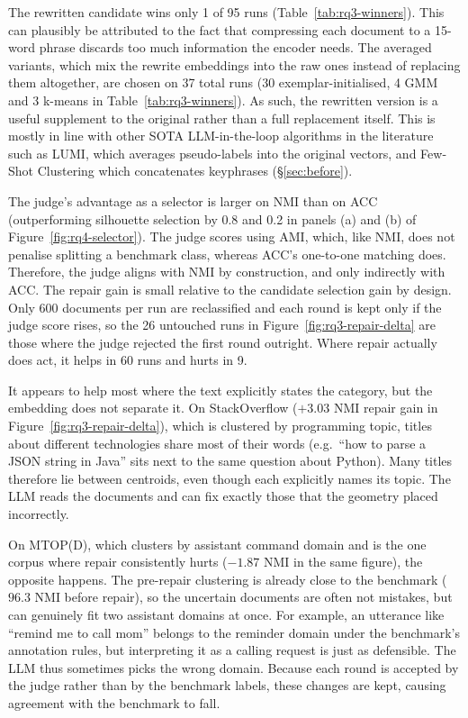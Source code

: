 \documentclass[11pt,a4paper,oneside]{report}
\begin{document}
The rewritten candidate wins only 1 of 95 runs
(Table~\ref{tab:rq3-winners}). This can plausibly be attributed to the fact that compressing each document to a 15-word phrase discards too much information the encoder needs. The averaged variants, which mix the rewrite embeddings into the raw ones instead of replacing
them altogether, are chosen on 37 total runs (30 exemplar-initialised, 4 GMM and 3 k-means in Table~\ref{tab:rq3-winners}). As such, the rewritten version is a useful supplement to the original rather than a full replacement itself. This is mostly in line with other SOTA LLM-in-the-loop algorithms in the literature such as LUMI, which averages pseudo-labels into the original vectors, and Few-Shot Clustering which concatenates keyphrases (\S\ref{sec:before}).


The judge's advantage as a selector is larger on NMI than on ACC (outperforming silhouette selection by 0.8 and 0.2 in panels (a) and (b) of Figure~\ref{fig:rq4-selector}). The judge scores using AMI, which, like NMI, does not penalise splitting a benchmark class, whereas ACC's one-to-one matching does. Therefore, the judge aligns with NMI by construction, and only indirectly with ACC. The repair gain is small relative to the candidate selection gain by design. Only 600 documents per run are reclassified and each round is kept only if
the judge score rises, so the 26 untouched runs in
Figure~\ref{fig:rq3-repair-delta} are those where the judge rejected the
first round outright. Where repair actually does act, it helps in 60 runs and hurts in 9. 

It appears to help most where the text explicitly states the category, but the
embedding does not separate it. On StackOverflow ($+3.03$ NMI repair
gain in Figure~\ref{fig:rq3-repair-delta}), which is clustered by
programming topic, titles about different technologies share most of
their words (e.g.\ ``how to parse a JSON string in Java'' sits next to the
same question about Python). Many titles therefore lie between
centroids, even though each explicitly names its topic. The LLM reads
the documents and can fix exactly those that the geometry placed
incorrectly.

On MTOP(D), which clusters by assistant command domain and
is the one corpus where repair consistently hurts ($-1.87$ NMI in the
same figure), the opposite happens. The pre-repair clustering is already
close to the benchmark ($96.3$ NMI before repair), so the uncertain documents are often not
mistakes, but can genuinely fit two assistant domains at once. For example,
an utterance like ``remind me to call mom'' belongs to the reminder domain
under the benchmark's annotation rules, but interpreting it as a calling
request is just as defensible. The LLM thus sometimes picks the wrong
domain. Because each round is accepted by the judge rather than by the
benchmark labels, these changes are kept, causing agreement with the
benchmark to fall.
\end{document}
